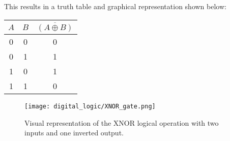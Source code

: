     This results in a truth table and graphical representation shown below:
    \begin{table}[h!]
        \begin{tabular}{c c | c}
            \toprule
            $A$ & $B$ & $\overline{(A \oplus B)}$  \\
            \midrule
             0  &  0  &    0    \\
             0  &  1  &    1    \\
             1  &  0  &    1    \\
             1  &  1  &    0    \\
            \bottomrule
        \end{tabular}
    \end{table}

    \begin{figure}[h!]
        \texttt{[image: digital\_logic/XNOR\_gate.png]}
        \caption[XNOR Gate]{Visual representation of the XNOR logical operation with two inputs and one inverted output.}
    \end{figure}


